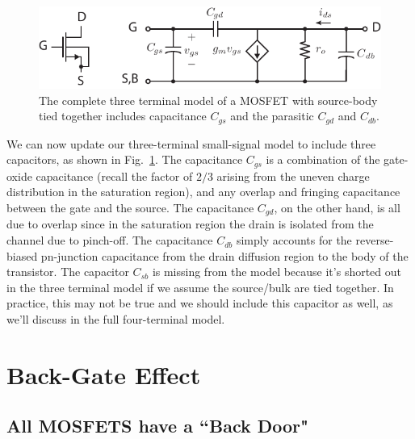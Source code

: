 \begin{figure}[tb]
\begin{center}
\includegraphics[scale=1]{mos3term_ac}
\end{center}
\caption{The complete three terminal model of a MOSFET with source-body tied together includes  capacitance $C_{gs}$ and the parasitic $C_{gd}$ and $C_{db}$.} \label{fig:mos3term_ac}
\end{figure}

We can now update our three-terminal small-signal model to include three capacitors, as shown in Fig.~\ref{fig:mos3term_ac}.  The capacitance $C_{gs}$ is a combination of the gate-oxide capacitance (recall the factor of $2/3$ arising from the uneven charge distribution in the saturation region), and any overlap and fringing capacitance between the gate and the source.  The capacitance $C_{gd}$, on the other hand, is all due to overlap since in the saturation region the drain is isolated from the channel due to pinch-off.  The capacitance $C_{db}$ simply accounts for the reverse-biased pn-junction capacitance from the drain diffusion region to the body of the transistor.  The capacitor $C_{sb}$ is missing from the model because it's shorted out in the three terminal model if we assume the source/bulk are tied together.  In practice, this may not be true and we should include this capacitor as well, as we'll discuss in the full four-terminal model.  
	 


\section{Back-Gate Effect}


\subsection{All MOSFETS have a ``Back Door"}

